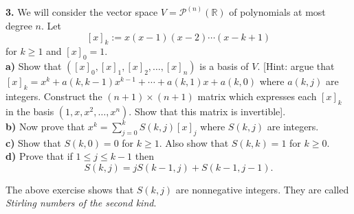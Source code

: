 \documentclass[11pt]{amsart}
\theoremstyle{definition}  %
\newcommand{\R}{\mathbb{R}}
\begin{document}
\vskip 0.1cm
\noindent
{\bf 3.} We will consider the vector space $ V = \mathcal{P}^{(n)}(\R)$ of polynomials at most degree $n$. Let 
$$[x]_k := x(x-1)(x-2) \cdots (x-k+1)$$
for $k \geq 1$ and $[x]_0 = 1$. \\
{\bf a)} Show that $([x]_0, [x]_1, [x]_2, \ldots, [x]_n)$ is a basis of $V$. [Hint: argue that   
$[x]_k = x^k + a(k,k-1) x^{k-1} + \cdots + a(k,1) x + a(k,0)$ where $a(k,j)$ are integers. Construct the $(n+1) \times (n+1)$ matrix
which expresses each $[x]_k$ in the basis $(1,x,x^2, \ldots, x^n)$. Show that this matrix is invertible].\\
{\bf b)} Now prove that $x^k = \sum_{j=0}^k S(k,j) [x]_j$ where $S(k,j)$ are integers. \\
{\bf c)} Show that $S(k,0) = 0 $ for $k \geq 1$. Also show that $S(k,k) = 1$ for $k\geq 0 $. \\
{\bf d)} Prove that if $ 1 \leq j \leq k-1$ then
$$ S(k,j) = j S(k-1, j) + S(k-1, j-1).$$ 

\vskip 0.1cm
\noindent
The above exercise shows that $S(k,j)$ are nonnegative integers. They are called {\it Stirling numbers of the second kind}. 
\end{document}
